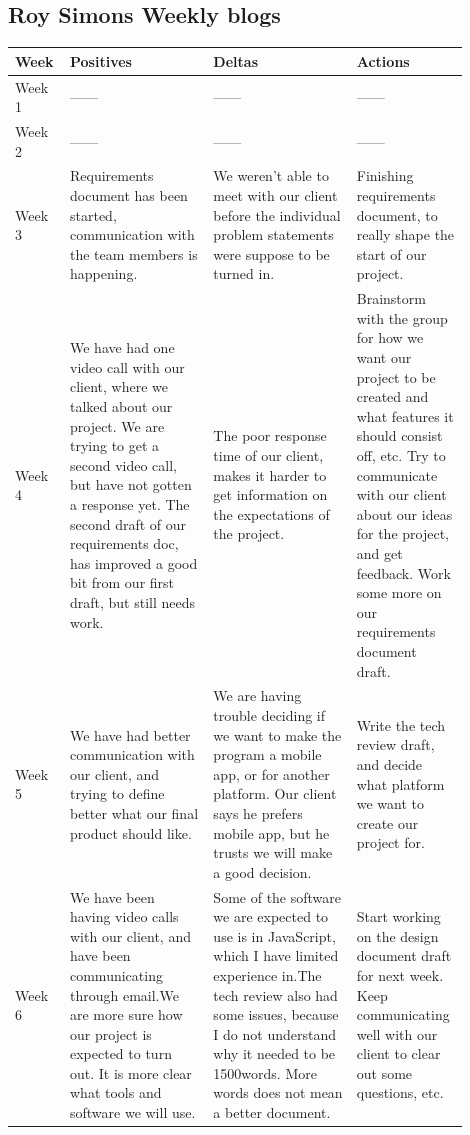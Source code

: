 \documentclass[draftclsnofoot,10pt,onecolumn]{IEEEtran}
\begin{document}
\subsection{Roy Simons Weekly blogs}
\begin{tabular}{p{0.1\linewidth}p{0.3\linewidth}p{0.3\linewidth}p{0.2\linewidth}}
        \hline
             \textbf{Week}
             & \textbf{Positives}
             & \textbf{Deltas}
             & \textbf{Actions}\\
             \hline
             Week 1
             & ------
             & ------
             & ------\\
             \hline
             Week 2
             & ------
             & ------
             & ------\\
             \hline
             Week 3
             & Requirements document has been started, communication with the team members is happening.
             & We weren't able to meet with our client before the individual problem statements were suppose to be turned in.
             & Finishing requirements document, to really shape the start of our project.\\
            \hline
             Week 4
             & We have had one video call with our client, where we talked about our project. We are trying to get a second video call, but have not gotten a response yet. The second draft of our requirements doc, has improved a good bit from our first draft, but still needs work.
             & The poor response time of our client, makes it harder to get information on the expectations of the project. 
             & Brainstorm with the group for how we want our project to be created and what features it should consist off, etc. Try to communicate with our client about our ideas for the project, and get feedback. Work some more on our requirements document draft.\\
            \hline
             Week 5
             & We have had better communication with our client, and trying to define better what our final product should like.
             & We are having trouble deciding if we want to make the program a mobile app, or for another platform. Our client says he prefers mobile app, but he trusts we will make a good decision.
             & Write the tech review draft, and decide what platform we want to create our project for.\\
            \hline
             Week 6
             & We have been having video calls with our client, and have been communicating through email.We are more sure how our project is expected to turn out. It is more clear what tools and software we will use.
             & Some of the software we are expected to use is in JavaScript, which I have limited experience in.The tech review also had some issues, because I do not understand why it needed to be 1500words. More words does not mean a better document.
             & Start working on the design document draft for next week. Keep communicating well with our client to clear out some questions, etc.\\
             \end{tabular}
\end{document}
